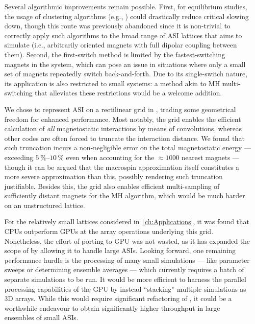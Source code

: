 Several algorithmic improvements remain possible.
First, for equilibrium studies, the usage of clustering algorithms (e.g., ) could drastically reduce critical slowing down, though this route was previously abandoned since it is non-trivial to correctly apply such algorithms to the broad range of ASI lattices that \hotspice aims to simulate (i.e., arbitrarily oriented magnets with full dipolar coupling between them).
Second, the first-switch method is limited by the fastest-switching magnets in the system, which can pose an issue in situations where only a small set of magnets repeatedly switch back-and-forth.
Due to its single-switch nature, its application is also restricted to small systems: a method akin to MH multi-switching that alleviates these restrictions would be a welcome addition. \par
We chose to represent ASI on a rectilinear grid in \hotspice, trading some geometrical freedom for enhanced performance. %
Most notably, the grid enables the efficient calculation of \textit{all} magnetostatic interactions by means of convolutions, whereas other codes are often forced to truncate the interaction distance.
We found that such truncation incurs a non-negligible error on the total magnetostatic energy --- exceeding $\SIrange{5}{10}{\percent}$ even when accounting for the $\approx 1000$ nearest magnets --- though it can be argued that the macrospin approximation itself constitutes a more severe approximation than this, possibly rendering such truncation justifiable.
Besides this, the grid also enables efficient multi-sampling of sufficiently distant magnets for the MH algorithm, which would be much harder on an unstructured lattice. \par
For the relatively small lattices considered in~\cref{ch:Applications}, it was found that CPUs outperform GPUs at the array operations underlying this grid. %
Nonetheless, the effort of porting \hotspice to GPU was not wasted, as it has expanded the scope of \hotspice by allowing it to handle large ASIs.
Looking forward, one remaining performance hurdle is the processing of many small simulations --- like parameter sweeps or determining ensemble averages --- which currently requires a batch of separate simulations to be run.
It would be more efficient to harness the parallel processing capabilities of the GPU by instead ``stacking'' multiple simulations as 3D arrays.
While this would require significant refactoring of \hotspice, it could be a worthwhile endeavour to obtain significantly higher throughput in large ensembles of small ASIs.


